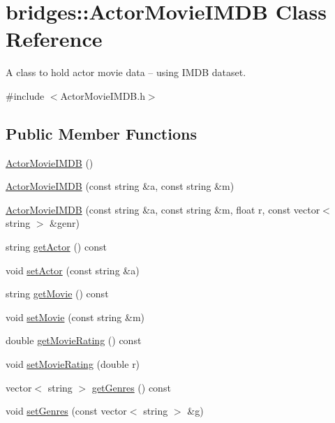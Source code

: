 \hypertarget{classbridges_1_1_actor_movie_i_m_d_b}{}\section{bridges\+:\+:Actor\+Movie\+I\+M\+D\+B Class Reference}
\label{classbridges_1_1_actor_movie_i_m_d_b}


A class to hold actor movie data -- using I\+M\+D\+B dataset.  




{\ttfamily \#include $<$Actor\+Movie\+I\+M\+D\+B.\+h$>$}

\subsection*{Public Member Functions}
\begin{DoxyCompactItemize}
\item 
\hyperlink{classbridges_1_1_actor_movie_i_m_d_b_acd1db3914821a79a7d8fb506151d36a4}{Actor\+Movie\+I\+M\+D\+B} ()
\item 
\hyperlink{classbridges_1_1_actor_movie_i_m_d_b_a25dc6c2c2fd93d6add4e11500f81e981}{Actor\+Movie\+I\+M\+D\+B} (const string \&a, const string \&m)
\item 
\hyperlink{classbridges_1_1_actor_movie_i_m_d_b_a9c8f4acb9530b1a6adebb5ba1d163b4c}{Actor\+Movie\+I\+M\+D\+B} (const string \&a, const string \&m, float r, const vector$<$ string $>$ \&genr)
\item 
string \hyperlink{classbridges_1_1_actor_movie_i_m_d_b_a255d0d289613fb3f13b1e1c8e9bbf32a}{get\+Actor} () const 
\item 
void \hyperlink{classbridges_1_1_actor_movie_i_m_d_b_a9fa0b6d2a529c40640966aa078cf7ee2}{set\+Actor} (const string \&a)
\item 
string \hyperlink{classbridges_1_1_actor_movie_i_m_d_b_ac1828592332447c84343daeefdedf857}{get\+Movie} () const 
\item 
void \hyperlink{classbridges_1_1_actor_movie_i_m_d_b_ae773ef3fc7ae370d4ab2bc1aeac60a9a}{set\+Movie} (const string \&m)
\item 
double \hyperlink{classbridges_1_1_actor_movie_i_m_d_b_a1a94ecc15569d5ca5c3f0b6f068a695e}{get\+Movie\+Rating} () const 
\item 
void \hyperlink{classbridges_1_1_actor_movie_i_m_d_b_aea16db5315526ff31a1685c08390cdc7}{set\+Movie\+Rating} (double r)
\item 
vector$<$ string $>$ \hyperlink{classbridges_1_1_actor_movie_i_m_d_b_ad8fa6e4f114e8b494c0438459be23970}{get\+Genres} () const 
\item 
void \hyperlink{classbridges_1_1_actor_movie_i_m_d_b_acae015a46ec88155ca159974f29ba234}{set\+Genres} (const vector$<$ string $>$ \&g)
\end{DoxyCompactItemize}


